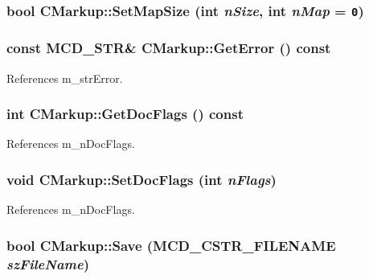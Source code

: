 \subsubsection[SetMapSize]{\setlength{\rightskip}{0pt plus 5cm}bool CMarkup::SetMapSize (int {\em nSize}, \/  int {\em nMap} = {\tt 0})}\label{classCMarkup_834d5e280500d0f62cd6fdb53b834ebb}


\subsubsection[GetError]{\setlength{\rightskip}{0pt plus 5cm}const MCD\_\-STR\& CMarkup::GetError () const\hspace{0.3cm}{\tt  [inline]}}\label{classCMarkup_15f1042ff13167216b741f360e88f649}




References m\_\-strError.
\subsubsection[GetDocFlags]{\setlength{\rightskip}{0pt plus 5cm}int CMarkup::GetDocFlags () const\hspace{0.3cm}{\tt  [inline]}}\label{classCMarkup_455d13d62ba9f2fd3ce6ad3802376c1c}




References m\_\-nDocFlags.
\subsubsection[SetDocFlags]{\setlength{\rightskip}{0pt plus 5cm}void CMarkup::SetDocFlags (int {\em nFlags})\hspace{0.3cm}{\tt  [inline]}}\label{classCMarkup_3cf48b937254c4cd36e0c9cc7b76cff1}




References m\_\-nDocFlags.
\subsubsection[Save]{\setlength{\rightskip}{0pt plus 5cm}bool CMarkup::Save (MCD\_\-CSTR\_\-FILENAME {\em szFileName})}\label{classCMarkup_61b774f533449eeda7f3d78d8d69e4fb}


